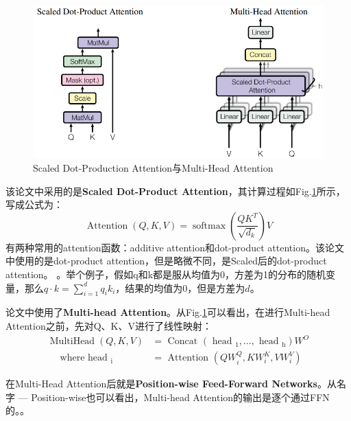 \begin{figure}[h]
	\centering
	\includegraphics[width=.8\textwidth]{pics/Scaled Dot-Production Attention and Multi-Head Attention.PNG}
	\caption{Scaled Dot-Production Attention与Multi-Head Attention}
	\label{fig:scaled dot-product attention and multi-head attention}
\end{figure}

该论文中采用的是\textbf{Scaled Dot-Product Attention}，其计算过程如Fig.\ref{fig:scaled dot-product attention and multi-head attention}所示，写成公式为：
$$
\operatorname{Attention}(Q, K, V)=\operatorname{softmax}\left(\frac{Q K^{T}}{\sqrt{d_{k}}}\right) V
$$
有两种常用的attention函数：additive attention和dot-product attention。该论文中使用的是dot-product attention，但是略微不同，是Scaled后的dot-product attention。
。举个例子，假如q和k都是服从均值为0，方差为1的分布的随机变量，那么$q \cdot k = \sum_{i=1}^{d} q_i k_i$，结果的均值为0，但是方差为$d$。

论文中使用了\textbf{Multi-head Attention}。从Fig.\ref{fig:scaled dot-product attention and multi-head attention}可以看出，在进行Multi-head Attention之前，先对Q、K、V进行了线性映射：
$$
\begin{aligned}
	\operatorname{MultiHead}(Q, K, V) &=\text { Concat }\left(\text { head }_{1}, \ldots, \text { head }_{\mathrm{h}}\right) W^{O} \\
	\quad \text { where head }_{\mathrm{i}} &=\text { Attention }\left(Q W_{i}^{Q}, K W_{i}^{K}, V W_{i}^{V}\right)
\end{aligned}
$$

在Multi-Head Attention后就是\textbf{Position-wise Feed-Forward Networks}。从名字 --- Position-wise也可以看出，Multi-head Attention的输出是逐个通过FFN的。。

